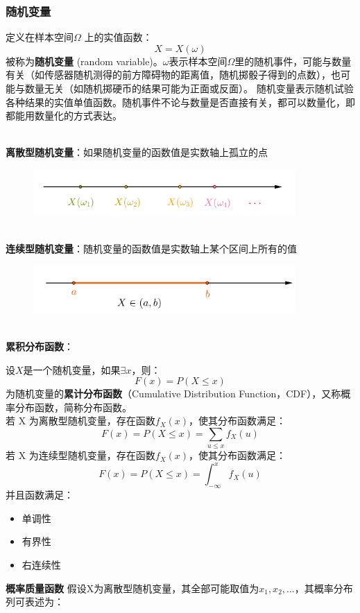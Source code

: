 \documentclass[12pt]{ctexart}
\begin{document}
\subsubsection{随机变量}
定义在样本空间$\Omega$ 上的实值函数：
\begin{equation}
    X = X(\omega)
\end{equation}
被称为\textbf{随机变量} (random variable)。$\omega$表示样本空间$\Omega$里的随机事件，可能与数量有关（如传感器随机测得的前方障碍物的距离值，随机掷骰子得到的点数），也可能与数量无关（如随机掷硬币的结果可能为正面或反面）。
随机变量表示随机试验各种结果的实值单值函数。随机事件不论与数量是否直接有关，都可以数量化，即都能用数量化的方式表达。
\par
~\\
\textbf{离散型随机变量}：如果随机变量的函数值是实数轴上孤立的点
\begin{figure}[h]
    \centering
    \includegraphics[width = 10cm]{image/640.png}
\end{figure}
\par
~\\
\textbf{连续型随机变量}：随机变量的函数值是实数轴上某个区间上所有的值
\begin{figure}[h]
    \centering
    \includegraphics[width = 10cm]{image/1.png}
\end{figure}
~\\
\textbf{累积分布函数}：
\par
设$X$是一个随机变量，如果$\exists x$，则：
\begin{equation}
    F(x) = P(X\leq x )
\end{equation}
为随机变量的\textbf{累计分布函数}（Cumulative Distribution Function，CDF），又称概率分布函数，简称分布函数。
\\若 X 为离散型随机变量，存在函数$f_X(x)$，使其分布函数满足：
\begin{equation}
    F(x) = P(X\leq x)=\sum_{u\leq x}f_X(u)
\end{equation}
若 X 为连续型随机变量，存在函数$f_X(x)$，使其分布函数满足：
\begin{equation}
    F(x) = P(X\leq x)=\int_{-\infty}^{x}f_X(u)
\end{equation}
并且函数满足：
\begin{itemize}
    \item 单调性
    \item 有界性
    \item 右连续性
\end{itemize}
\par
\textbf{概率质量函数}
假设X为离散型随机变量，其全部可能取值为$x_1,x_2,\dots$，其概率分布列可表述为：
\end{document}
